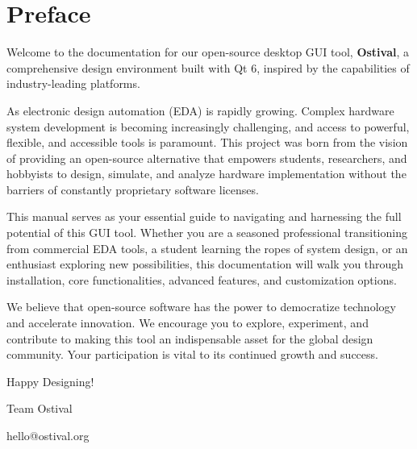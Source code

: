 \chapter*{Preface}

Welcome to the documentation for our open-source desktop GUI tool, \textbf{Ostival}, a comprehensive design environment built with Qt 6, inspired by the capabilities of industry-leading platforms.

As electronic design automation (EDA) is rapidly growing. Complex hardware system development is becoming increasingly challenging, and access to powerful, flexible, and accessible tools is paramount. This project was born from the vision of providing an open-source alternative that empowers students, researchers, and hobbyists to design, simulate, and analyze hardware implementation without the barriers of constantly proprietary software licenses.

This manual serves as your essential guide to navigating and harnessing the full potential of this GUI tool. Whether you are a seasoned professional transitioning from commercial EDA tools, a student learning the ropes of system design, or an enthusiast exploring new possibilities, this documentation will walk you through installation, core functionalities, advanced features, and customization options.

We believe that open-source software has the power to democratize technology and accelerate innovation. We encourage you to explore, experiment, and contribute to making this tool an indispensable asset for the global design community. Your participation is vital to its continued growth and success.

\vfill

Happy Designing!

Team Ostival

hello@ostival.org
